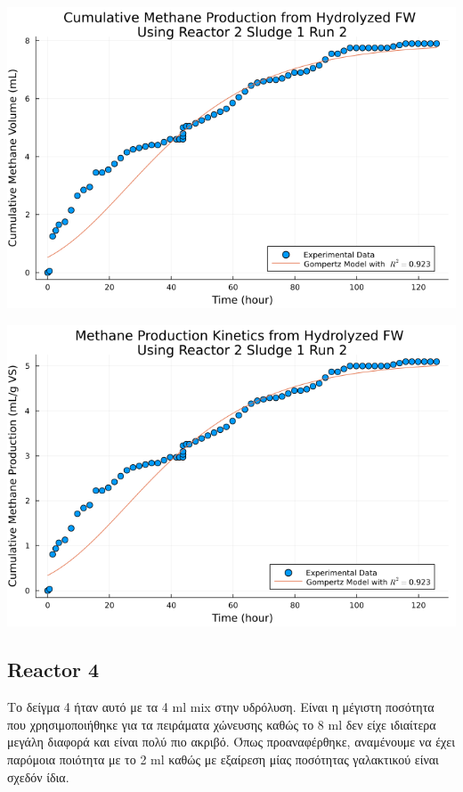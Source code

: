 \documentclass[11pt]{article}
\begin{document}
\begin{center}
\includegraphics[width=.9\linewidth]{../plots/BMPs/Hydrolyzed FW/methane_kinetics_hydrolysate_2_s1_r2_hour.png}
\end{center}

\begin{center}
\includegraphics[width=.9\linewidth]{../plots/BMPs/Hydrolyzed FW/specific_methane_kinetics_hydrolysate_2_s1_r2_hour.png}
\end{center}

\subsection{Reactor 4}
\label{sec:orgec954b8}
Το δείγμα 4 ήταν αυτό με τα 4 ml mix στην υδρόλυση. Είναι η μέγιστη ποσότητα που χρησιμοποιήθηκε για τα πειράματα χώνευσης καθώς το 8 ml δεν είχε ιδιαίτερα μεγάλη διαφορά και είναι πολύ πιο ακριβό. Όπως προαναφέρθηκε, αναμένουμε να έχει παρόμοια ποιότητα με το 2 ml καθώς με εξαίρεση μίας ποσότητας γαλακτικού είναι σχεδόν ίδια.
\end{document}
